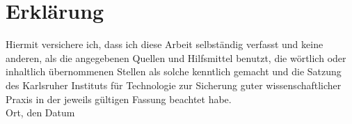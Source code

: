 \documentclass[12pt,a4paper]{scrartcl}
\theoremstyle{plain}
\theoremstyle{definition}
\newcommand{\2}{\mathbb{Z} / 2 \mathbb{Z}}
\newcommand{\1}{\bar{1}}
\newcommand{\0}{\bar{0}}
\begin{document}
\newpage
  
 \thispagestyle{empty}


\vspace*{8cm}


\section*{Erklärung}

Hiermit versichere ich, dass ich diese Arbeit selbständig verfasst und keine anderen, als die angegebenen Quellen und Hilfsmittel benutzt, die wörtlich oder inhaltlich übernommenen Stellen als solche kenntlich gemacht und die Satzung des Karlsruher Instituts für Technologie zur Sicherung guter wissenschaftlicher Praxis in der jeweils gültigen Fassung beachtet habe. \\[2ex] 

\noindent
Ort, den Datum\\[5ex]

\end{document}
